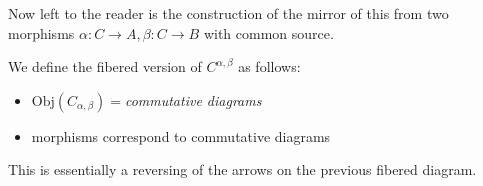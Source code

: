 \documentclass{report}
\begin{document}
\begin{examples}
\begin{example}[\label{exm:1.3.10}]
        Now left to the reader is the construction of the mirror of this from two morphisms $\alpha : C \rightarrow A, \beta : C \rightarrow B$ with common source.

        We define the fibered version of $C^{\alpha, \beta}$ as follows:
            \begin{itemize}
                \item $\text{Obj}(C_{\alpha, \beta}) = $\textit{commutative diagrams}
                    \begin{center}
                    \end{center}

                \item morphisms correspond to commutative diagrams
                    \begin{center}
                    \end{center}
            \end{itemize}
        This is essentially a reversing of the arrows on the previous fibered diagram.
    \end{example}
\end{examples}
\end{document}
